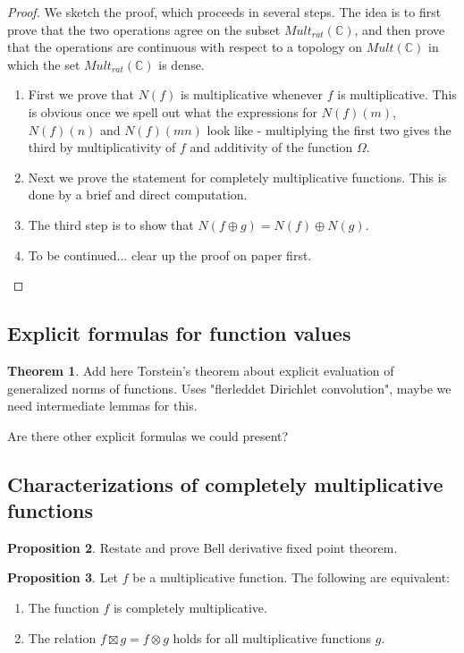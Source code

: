 \documentclass[a4paper]{article}
\theoremstyle{definition}
\newtheorem{theorem}{Theorem}[section]
\newtheorem{proposition}[theorem]{Proposition}
\theoremstyle{remark}
\newcommand{\C}{\mathbb{C}}
\begin{document}
\begin{proof}
We sketch the proof, which proceeds in several steps. The idea is to first prove that the two operations agree on the subset $Mult_{rat}(\C)$, and then prove that the operations are continuous with respect to a topology on $Mult(\C)$ in which the set $Mult_{rat}(\C)$ is dense. 


\begin{enumerate}
\item First we prove that $N(f)$ is multiplicative whenever $f$ is multiplicative. This is obvious once we spell out what the expressions for $N(f)(m)$, $N(f)(n)$ and $N(f)(mn)$ look like - multiplying the first two gives the third by multiplicativity of $f$ and additivity of the function $\Omega$.
\item Next we prove the statement for completely multiplicative functions. This is done by a brief and direct computation.
\item The third step is to show that $N(f \oplus g) = N(f) \oplus N(g)$.
\item To be continued... clear up the proof on paper first.


\end{enumerate}

\end{proof}


\subsection{Explicit formulas for function values}

\begin{theorem}
Add here Torstein's theorem about explicit evaluation of generalized norms of functions. Uses "flerleddet Dirichlet convolution", maybe we need intermediate lemmas for this.
\end{theorem}

Are there other explicit formulas we could present?

\subsection{Characterizations of completely multiplicative functions}


\begin{proposition}
Restate and prove Bell derivative fixed point theorem.
\end{proposition}

\begin{proposition}
Let $f$ be a multiplicative function. The following are equivalent:
\begin{enumerate}
\item The function $f$ is completely multiplicative.
\item The relation $f \boxtimes g = f \otimes g$ holds for all multiplicative functions $g$. 
\end{enumerate}
\end{proposition}
\end{document}

